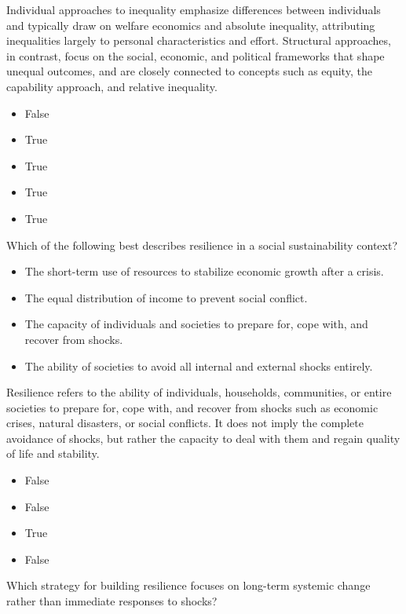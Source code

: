 \documentclass[
  a4paper,
  DIV=11,
  numbers=noendperiod,
  oneside,
  openany]{scrreprt}
\providecommand{\tightlist}{%
  \setlength{\itemsep}{0pt}\setlength{\parskip}{0pt}}
\begin{document}
Individual approaches to inequality emphasize differences between
individuals and typically draw on welfare economics and absolute
inequality, attributing inequalities largely to personal characteristics
and effort. Structural approaches, in contrast, focus on the social,
economic, and political frameworks that shape unequal outcomes, and are
closely connected to concepts such as equity, the capability approach,
and relative inequality.

\begin{itemize}
\tightlist
\item
  False
\item
  True
\item
  True
\item
  True
\item
  True
\end{itemize}

Which of the following best describes resilience in a social
sustainability context?

\begin{itemize}
\tightlist
\item[$\square$]
  The short-term use of resources to stabilize economic growth after a
  crisis.
\item[$\square$]
  The equal distribution of income to prevent social conflict.
\item[$\square$]
  The capacity of individuals and societies to prepare for, cope with,
  and recover from shocks.
\item[$\square$]
  The ability of societies to avoid all internal and external shocks
  entirely.
\end{itemize}

Resilience refers to the ability of individuals, households,
communities, or entire societies to prepare for, cope with, and recover
from shocks such as economic crises, natural disasters, or social
conflicts. It does not imply the complete avoidance of shocks, but
rather the capacity to deal with them and regain quality of life and
stability.

\begin{itemize}
\tightlist
\item
  False
\item
  False
\item
  True
\item
  False
\end{itemize}

Which strategy for building resilience focuses on long-term systemic
change rather than immediate responses to shocks?
\end{document}

